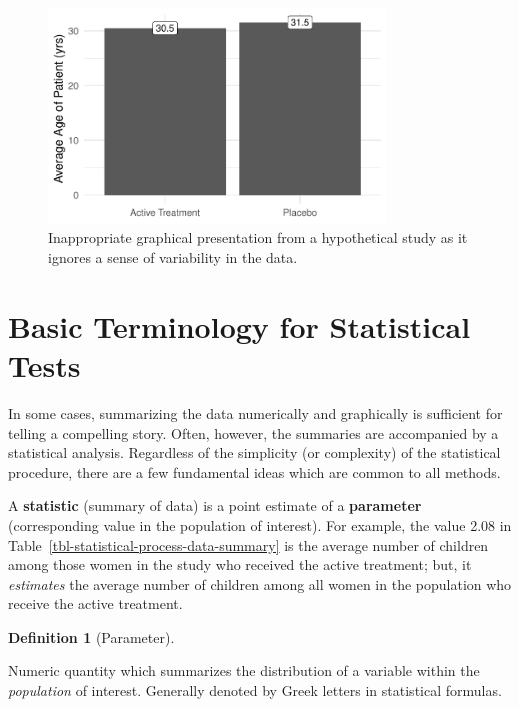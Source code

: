 \documentclass[
  letterpaper,
  DIV=11,
  numbers=noendperiod]{scrreprt}
\theoremstyle{definition}
\theoremstyle{definition}
\newtheorem{definition}{Definition}[chapter]
\theoremstyle{remark}
\begin{document}
\begin{figure}

{\centering \includegraphics[width=0.8\textwidth,height=\textheight]{./images/fig-statistical-process-poor-graphics-1.pdf}

}

\caption{\label{fig-statistical-process-poor-graphics}Inappropriate
graphical presentation from a hypothetical study as it ignores a sense
of variability in the data.}

\end{figure}

\hypertarget{basic-terminology-for-statistical-tests}{%
\section{Basic Terminology for Statistical
Tests}\label{basic-terminology-for-statistical-tests}}

In some cases, summarizing the data numerically and graphically is
sufficient for telling a compelling story. Often, however, the summaries
are accompanied by a statistical analysis. Regardless of the simplicity
(or complexity) of the statistical procedure, there are a few
fundamental ideas which are common to all methods.

A \textbf{statistic} (summary of data) is a point estimate of a
\textbf{parameter} (corresponding value in the population of interest).
For example, the value 2.08 in
Table~\ref{tbl-statistical-process-data-summary} is the average number
of children among those women in the study who received the active
treatment; but, it \emph{estimates} the average number of children among
all women in the population who receive the active treatment.

\begin{definition}[Parameter]\protect\hypertarget{def-parameter}{}\label{def-parameter}

Numeric quantity which summarizes the distribution of a variable within
the \emph{population} of interest. Generally denoted by Greek letters in
statistical formulas.

\end{definition}
\end{document}

